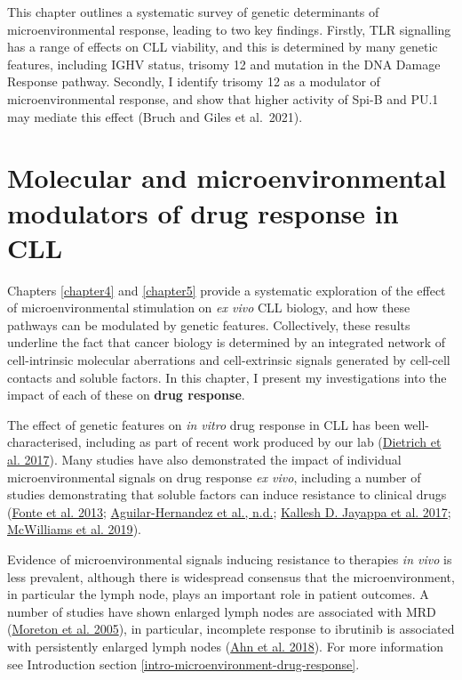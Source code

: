 \documentclass[11pt, a4paper, twosided]{book}
\begin{document}
This chapter outlines a systematic survey of genetic determinants of microenvironmental response, leading to two key findings. Firstly, TLR signalling has a range of effects on CLL viability, and this is determined by many genetic features, including IGHV status, trisomy 12 and mutation in the DNA Damage Response pathway. Secondly, I identify trisomy 12 as a modulator of microenvironmental response, and show that higher activity of Spi-B and PU.1 may mediate this effect (Bruch and Giles et al.~2021).

\hypertarget{chapter6}{%
\chapter{Molecular and microenvironmental modulators of drug response in CLL}\label{chapter6}}

Chapters \ref{chapter4} and \ref{chapter5} provide a systematic exploration of the effect of microenvironmental stimulation on \emph{ex vivo} CLL biology, and how these pathways can be modulated by genetic features. Collectively, these results underline the fact that cancer biology is determined by an integrated network of cell-intrinsic molecular aberrations and cell-extrinsic signals generated by cell-cell contacts and soluble factors. In this chapter, I present my investigations into the impact of each of these on \textbf{drug response}.

The effect of genetic features on \emph{in vitro} drug response in CLL has been well-characterised, including as part of recent work produced by our lab (\protect\hyperlink{ref-JCIpaper}{Dietrich et al. 2017}). Many studies have also demonstrated the impact of individual microenvironmental signals on drug response \emph{ex vivo}, including a number of studies demonstrating that soluble factors can induce resistance to clinical drugs (\protect\hyperlink{ref-Fonte2013}{Fonte et al. 2013}; \protect\hyperlink{ref-AguilarHernandez2016}{Aguilar-Hernandez et al., n.d.}; \protect\hyperlink{ref-Jayappa2017}{Kallesh D. Jayappa et al. 2017}; \protect\hyperlink{ref-McWilliams2019}{McWilliams et al. 2019}).

Evidence of microenvironmental signals inducing resistance to therapies \emph{in vivo} is less prevalent, although there is widespread consensus that the microenvironment, in particular the lymph node, plays an important role in patient outcomes. A number of studies have shown enlarged lymph nodes are associated with MRD (\protect\hyperlink{ref-Moreton2005}{Moreton et al. 2005}), in particular, incomplete response to ibrutinib is associated with persistently enlarged lymph nodes (\protect\hyperlink{ref-Ahn2018}{Ahn et al. 2018}). For more information see Introduction section \ref{intro-microenvironment-drug-response}.
\end{document}
